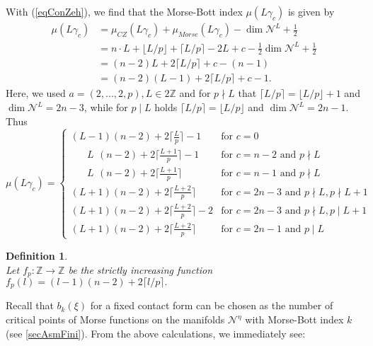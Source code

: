 \documentclass[a4paper,12pt,bibliography=totocnumbered,titlepage=false,abstracton,bookmarksnumbered=true]{scrartcl}
\newtheorem{defn}{Definition}
\theoremstyle{definition}
\begin{document}
With (\ref{eqConZeh}), we find that the Morse-Bott index $\mu(L\gamma_c)$ is given by
\begin{equation}\label{eqMorBot}\begin{aligned}
 \mu(L\gamma_c)&=\mu_{CZ}(L\gamma_c)+\mu_{Morse}(L\gamma_c)-\dim\mathcal{N}^L+{\textstyle \frac{1}{2}}\\
 &=n{\cdot} L+\big\lfloor L/p\big\rfloor+\big\lceil L/p\big\rceil-2L+c-{\textstyle\frac{1}{2}}\dim \mathcal{N}^L+{\textstyle\frac{1}{2}}\\
 &=(n{-}2) L + 2\big\lceil L/p\big\rceil+c-(n{-}1)\\
 &=(n{-}2)(L{-}1)+2\big\lceil L/p\big\rceil+c-1.\end{aligned}
\end{equation}
Here, we used $a=(2,...,2,p), L\in2\mathbb{Z}$ and for $p\nmid L$ that $\lceil L/p\rceil=\lfloor L/p\rfloor{+}1$ and $\dim\mathcal{N}^L=2n{-}3$, while for $p\mid L$ holds $\lceil L/p\rceil=\lfloor L/p\rfloor$ and $\dim\mathcal{N}^L=2n{-}1$. Thus
\[\mu(L\gamma_c)=
\begin{cases}
 (L{-}1)(n{-}2)+2\big\lceil \textstyle\frac{L}{p}\big\rceil-1 & \text{for }c=0\\
 \phantom{(-1} L\phantom{)}(n{-}2)+2\big\lceil \textstyle\frac{L+1}{p}\big\rceil-1 & \text{for } c=n{-}2 \text{ and }p\nmid L\\
 \phantom{(-1} L\phantom{)}(n{-}2)+2\big\lceil \textstyle\frac{L+1}{p}\big\rceil & \text{for } c=n{-}1 \text{ and }p\nmid L\\
 (L{+}1)(n{-}2)+2\big\lceil \textstyle\frac{L+2}{p}\big\rceil & \text{for } c=2n{-}3 \text{ and }p\nmid L, p\nmid L{+}1\\
 (L{+}1)(n{-}2)+2\big\lceil \textstyle\frac{L+2}{p}\big\rceil-2 & \text{for } c=2n{-}3 \text{ and }p\nmid L, p\mid L{+}1\\
 (L{+}1)(n{-}2)+2\big\lceil \textstyle\frac{L+2}{p}\big\rceil & \text{for } c=2n{-}1 \text{ and }p\mid L
\end{cases}\]
\begin{defn}~\\
 Let $f_p:\mathbb{Z}\rightarrow\mathbb{Z}$ be the strictly increasing function $f_p(l)=(l{-}1)(n{-}2)+2\big\lceil l/p\big\rceil.$
\end{defn}
Recall that $b_k(\xi)$ for a fixed contact form can be chosen as the number of critical points of Morse functions on the manifolds $\mathcal{N}^\eta$ with Morse-Bott index $k$ (see \ref{secAsmFini}). From the above calculations, we immediately see:
\end{document}
